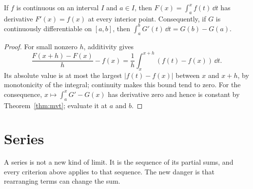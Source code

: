 \begin{proposition}\label{prop:early-ftc}
If $f$ is continuous on an interval $I$ and $a\in I$, then
$F(x)=\int_a^x f(t)\,\dd t$ has derivative $F'(x)=f(x)$ at every interior point.
Consequently, if $G$ is continuously differentiable on $[a,b]$, then
$\int_a^b G'(t)\,\dd t=G(b)-G(a)$.
\end{proposition}
\begin{proof}
For small nonzero $h$, additivity gives
\[
\frac{F(x+h)-F(x)}h-f(x)
=\frac1h\int_x^{x+h}(f(t)-f(x))\,\dd t.
\]
Its absolute value is at most the largest $|f(t)-f(x)|$ between $x$ and $x+h$,
by monotonicity of the integral; continuity makes this bound tend to zero.
For the consequence, $x\mapsto\int_a^x G'-G(x)$ has derivative zero and hence
is constant by Theorem~\ref{thm:mvt}; evaluate it at $a$ and $b$.
\end{proof}

\section{Series}

A series is not a new kind of limit. It is the sequence of its partial sums, and every criterion above applies to that sequence. The new danger is that rearranging terms can change the sum.

